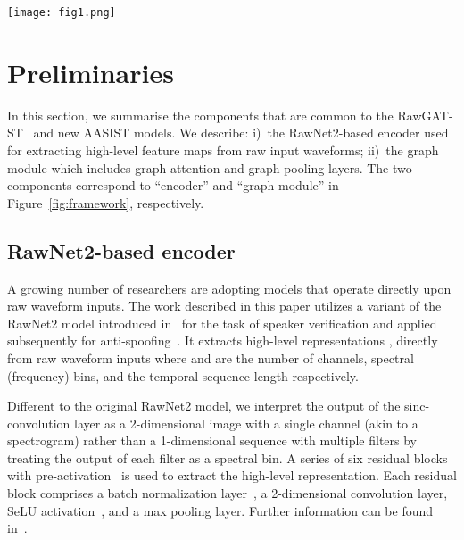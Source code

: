 \documentclass{article}
\begin{document}
\begin{figure*}[ht!]
    \centering
    \texttt{[image: fig1.png]}
    \caption{
      Overall framework of the proposed AASIST.
      {\em Identical to} \cite{tak2021end}: encoder extracts  and two graph modules each model spectral and temporal domains. 
      {\em Proposed}: then, the proposed max graph operation technique adopts two branches that model heterogeneous graphs in parallel, followed by an element-wise maximum. 
      Each branch includes two proposed HS-GAL layers and two graph pooling layers (graph pooling layers and one HS-GAL layer is omitted in the illustration). 
      Finally, the maximum and average of nodes, and the stack node are concatenated followed by an output layer.
      }
    \vspace{-10pt}
    \label{fig:framework}
\end{figure*}

\section{Preliminaries}
In this section, we summarise the components that are common to the RawGAT-ST~\cite{tak2021end} and new AASIST models.
We describe: i)~the RawNet2-based encoder used for extracting high-level feature maps from raw input waveforms; ii)~the graph module which includes graph attention and graph pooling layers.
The two components correspond to ``encoder'' and ``graph module'' in Figure~\ref{fig:framework}, respectively.

\subsection{RawNet2-based encoder}
\label{sec:encoder}
A growing number of researchers are adopting models that operate directly upon raw waveform inputs. 
The work described in this paper utilizes a variant of the RawNet2 model introduced in~\cite{jung20c_interspeech} for the task of speaker verification and applied subsequently for anti-spoofing~\cite{tak2021rawnet,tak2021end}.
It extracts high-level representations ,  directly from raw waveform inputs where  and  are the number of channels, spectral (frequency) bins, and the temporal sequence length respectively. 

Different to the original RawNet2 model, we interpret the output of the sinc-convolution layer as a 2-dimensional image with a single channel (akin to a spectrogram) rather than a 1-dimensional sequence with multiple filters by treating the output of each filter as a spectral bin.
A series of six residual blocks with pre-activation~\cite{he2016identity} is used to extract the high-level representation.
Each residual block comprises a batch normalization layer~\cite{ioffe2015batch}, a 2-dimensional convolution layer, SeLU activation~\cite{klambauer2017self}, and a max pooling layer. 
Further information can be found in~\cite{tak2021end}.
\end{document}
